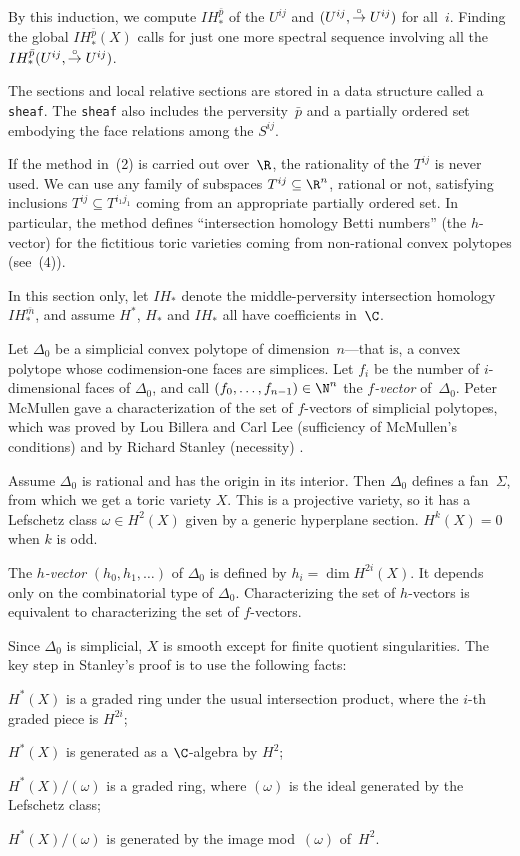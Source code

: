 By this induction, we compute $IH_*^{\bar p}$ of the $U^{ij}$ and
$(U^{ij}, \overset\circ\to U^{ij})$ for all~$i$.  Finding the global $IH_*^{\bar
p}(X)$ calls for just one more spectral sequence involving all the
$IH_*^{\bar p}(U^{ij}, \overset\circ\to U^{ij})$.

The sections and local relative sections are stored in a data
structure called a {\tt sheaf}.  The {\tt sheaf} also includes the
perversity~$\bar p$ and a partially ordered set embodying the face
relations among the $S^{ij}$.

 If the method
in~(2) is carried out over~$\R$, the rationality of the $T^{ij}$ is
never used.  We can use any family of subspaces $T^{ij}\subseteq
\R^n$, rational or not, satisfying inclusions $T^{ij} \subseteq T^{i_1
j_1}$ coming from an appropriate partially ordered set.  In
particular, the method defines ``intersection homology Betti numbers''
(the $h$-vector) for the fictitious toric varieties coming from
non-rational convex polytopes (see~(4)).

 In
this section only, let $IH_*$ denote the middle-perversity intersection
homology $IH^{\bar m}_*$, and assume $H^*$, $H_*$ and $IH_*$ all have
coefficients in~$\C$.

Let $\Delta_0$ be a simplicial convex polytope of dimension~$n$---that
is, a convex polytope whose codimension-one faces are simplices.  Let
$f_i$ be the number of $i$-dimensional faces of $\Delta_0$, and call
$(f_0, \dots, f_{n-1}) \in \N^n$ the {\sl $f$-vector\/} of~$\Delta_0$.
Peter McMullen gave a characterization of the set of $f$-vectors of
simplicial polytopes, which was proved by Lou Billera and Carl Lee
(sufficiency of McMullen's conditions) \cite{Bi-L} and by Richard
Stanley (necessity) \cite{St1}.

Assume $\Delta_0$ is rational and has the origin in its interior.
Then $\Delta_0$ defines a fan~$\Sigma$, from which we get a toric
variety $X$.  This is a projective variety, so it has a Lefschetz
class $\omega \in H^2(X)$ given by a generic hyperplane section.
$H^k(X) = 0$ when $k$ is odd.

The {\sl $h$-vector\/} $(h_0, h_1, \dots)$ of $\Delta_0$ is defined by
$h_i = \dim H^{2i}(X)$.  It depends only on the combinatorial type
of $\Delta_0$.  Characterizing the set of $h$-vectors is equivalent to
characterizing the set of $f$-vectors.

Since $\Delta_0$ is simplicial, $X$ is smooth except for finite quotient
singularities.  The key step in Stanley's proof is to use the
following facts:
\roster
\item $H^*(X)$ is a graded ring under the usual intersection
product, where the $i$-th graded piece is $H^{2i}$;
\item $H^*(X)$ is generated as a
$\C$-algebra by $H^2$;
\item $H^*(X)/(\omega)$ is a graded ring, where $(\omega)$ is the
ideal generated by the Lefschetz class;
\item $H^*(X)/(\omega)$ is generated by the image mod~$(\omega)$
of~$H^2$.
\endroster

